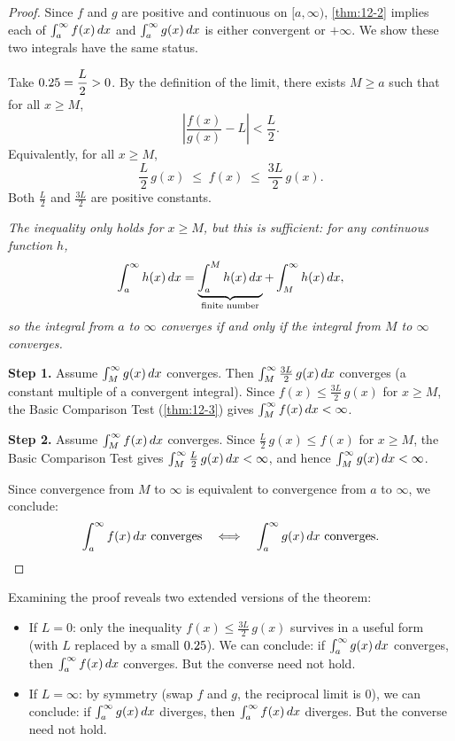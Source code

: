 \begin{proof}
Since $f$ and $g$ are positive and continuous on $[a,\infty)$, \cref{thm:12-2} implies each of $\int_{a}^{\infty}f(x)\,dx$ and $\int_{a}^{\infty}g(x)\,dx$ is either convergent or $+\infty$.  We show these two integrals have the same status.

Take $0.25=\dfrac{L}{2}>0$.  By the definition of the limit, there exists $M\ge a$ such that for all $x\ge M$,
\[
  \left\lvert\frac{f(x)}{g(x)}-L\right\rvert < \frac{L}{2}.
\]
Equivalently, for all $x\ge M$,
\[
  \frac{L}{2}\,g(x) \;\le\; f(x) \;\le\; \frac{3L}{2}\,g(x).
\]
Both $\frac{L}{2}$ and $\frac{3L}{2}$ are positive constants.

\textit{The inequality only holds for $x\ge M$, but this is sufficient: for any continuous function $h$,}
\[
  \int_{a}^{\infty}h(x)\,dx = \underbrace{\int_{a}^{M}h(x)\,dx}_{\text{finite number}} + \int_{M}^{\infty}h(x)\,dx,
\]
\textit{so the integral from $a$ to $\infty$ converges if and only if the integral from $M$ to $\infty$ converges.}

\textbf{Step 1.}  Assume $\int_{M}^{\infty}g(x)\,dx$ converges.  Then $\int_{M}^{\infty}\frac{3L}{2}\,g(x)\,dx$ converges (a constant multiple of a convergent integral).  Since $f(x)\le\frac{3L}{2}\,g(x)$ for $x\ge M$, the Basic Comparison Test (\cref{thm:12-3}) gives $\int_{M}^{\infty}f(x)\,dx<\infty$.

\textbf{Step 2.}  Assume $\int_{M}^{\infty}f(x)\,dx$ converges.  Since $\frac{L}{2}\,g(x)\le f(x)$ for $x\ge M$, the Basic Comparison Test gives $\int_{M}^{\infty}\frac{L}{2}\,g(x)\,dx<\infty$, and hence $\int_{M}^{\infty}g(x)\,dx<\infty$.

Since convergence from $M$ to $\infty$ is equivalent to convergence from $a$ to $\infty$, we conclude:
\[
  \int_{a}^{\infty}f(x)\,dx \text{ converges}
  \quad\Longleftrightarrow\quad
  \int_{a}^{\infty}g(x)\,dx \text{ converges.} \qedhere
\]
\end{proof}

\begin{remark}
Examining the proof reveals two extended versions of the theorem:
\begin{itemize}
  \item If $L=0$: only the inequality $f(x)\le\frac{3L}{2}\,g(x)$ survives in a useful form (with $L$ replaced by a small $0.25$).  We can conclude: if $\int_{a}^{\infty}g(x)\,dx$ converges, then $\int_{a}^{\infty}f(x)\,dx$ converges.  But the converse need not hold.
  \item If $L=\infty$: by symmetry (swap $f$ and $g$, the reciprocal limit is $0$), we can conclude: if $\int_{a}^{\infty}g(x)\,dx$ diverges, then $\int_{a}^{\infty}f(x)\,dx$ diverges.  But the converse need not hold.
\end{itemize}
\end{remark}
